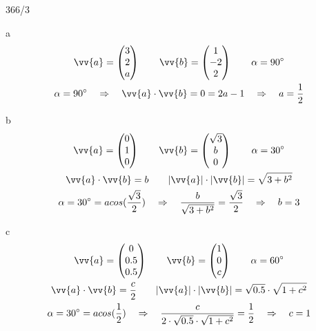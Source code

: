 \begin{exercise}{366/3}
  \item [a]
  \begin{gather*}
    \vv{a} = \begin{pmatrix}3 \\ 2 \\ a\end{pmatrix} \qquad \vv{b} = \begin{pmatrix}1 \\ -2 \\ 2\end{pmatrix} \qquad \alpha = 90^\circ \\
    \alpha = 90^\circ \quad\Rightarrow\quad \vv{a} \cdot \vv{b} = 0 = 2a - 1 \quad\Rightarrow\quad a = \frac{1}{2}
  \end{gather*}
  \item [b]
  \begin{gather*}
    \vv{a} = \begin{pmatrix}0 \\ 1 \\ 0\end{pmatrix} \qquad \vv{b} = \begin{pmatrix}\sqrt{3} \\ b \\ 0\end{pmatrix} \qquad \alpha = 30^\circ \\
    \vv{a} \cdot \vv{b} = b \qquad |\vv{a}| \cdot |\vv{b}| = \sqrt{3 + b^2} \\
    \alpha = 30^\circ = acos(\frac{\sqrt{3}}{2}) \quad\Rightarrow\quad \frac{b}{\sqrt{3 + b^2}} = \frac{\sqrt{3}}{2} \quad\Rightarrow\quad b = 3
  \end{gather*}
  \item [c]
  \begin{gather*}
    \vv{a} = \begin{pmatrix}0 \\ 0.5 \\ 0.5\end{pmatrix} \qquad \vv{b} = \begin{pmatrix}1 \\ 0 \\ c\end{pmatrix} \qquad \alpha = 60^\circ \\
    \vv{a} \cdot \vv{b} = \frac{c}{2} \qquad |\vv{a}| \cdot |\vv{b}| = \sqrt{0.5} \cdot \sqrt{1 + c^2} \\
    \alpha = 30^\circ = acos(\frac{1}{2}) \quad\Rightarrow\quad \frac{c}{2 \cdot \sqrt{0.5} \cdot \sqrt{1 + c^2}} = \frac{1}{2} \quad\Rightarrow\quad c = 1
  \end{gather*}
\end{exercise}
